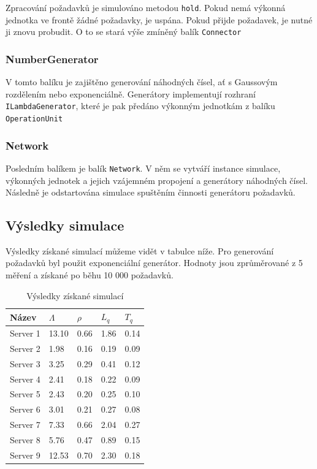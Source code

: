\documentclass{article}
\begin{document}
Zpracování požadavků je simulováno metodou \texttt{hold}. Pokud nemá výkonná jednotka ve frontě žádné požadavky, je uspána.
Pokud přijde požadavek, je nutné ji znovu probudit. O to se stará výše zmíněný balík \texttt{Connector}

\subsubsection{NumberGenerator}

V tomto balíku je zajištěno generování náhodných čísel, ať s Gaussovým rozdělením nebo exponenciálně. 
Generátory implementují rozhraní \texttt{ILambdaGenerator}, které je pak předáno výkonným jednotkám z balíku \texttt{OperationUnit}

\subsubsection{Network}
Posledním balíkem je balík \texttt{Network}. 
V něm se vytváří instance simulace, výkonných jednotek a jejich vzájemném propojení a generátory náhodných čísel. 
Následně je odstartována simulace spuštěním činnosti generátoru požadavků.

\subsection{Výsledky simulace}

Výsledky získané simulací můžeme vidět v tabulce níže.
Pro generování požadavků byl použit exponenciální generátor.
Hodnoty jsou zprůměrované z 5 měření a získané po běhu 10 000 požadavků.

\begin{table}[ht!]
	\centering
	\begin{tabular}{|l|l|l|l|l|}
		\hline
		Název    & $\Lambda$ & $\rho$  & $L_q$   & $T_q$   \\ \hline
		Server 1 & 13.10  & 0.66 & 1.86 & 0.14 \\ \hline
		Server 2 & 1.98   & 0.16 & 0.19 & 0.09 \\ \hline
		Server 3 & 3.25   & 0.29 & 0.41 & 0.12 \\ \hline
		Server 4 & 2.41   & 0.18 & 0.22 & 0.09 \\ \hline
		Server 5 & 2.43   & 0.20 & 0.25 & 0.10 \\ \hline
		Server 6 & 3.01   & 0.21 & 0.27 & 0.08 \\ \hline
		Server 7 & 7.33   & 0.66 & 2.04 & 0.27 \\ \hline
		Server 8 & 5.76   & 0.47 & 0.89 & 0.15 \\ \hline
		Server 9 & 12.53  & 0.70 & 2.30 & 0.18 \\ \hline
	\end{tabular}
	\caption {Výsledky získané simulací}
\end{table}
\end{document}
